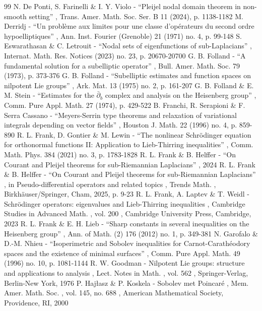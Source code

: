 \documentclass[11pt]{article}
\theoremstyle{definition}
\newcommand{\1}{\mathbbm{1}}
\numberwithin{equation}{section}
\begin{document}
\begin{thebibliography}{99}
 N. De Ponti, S. Farinelli \& I. Y. Violo - “Pleijel nodal domain theorem in non-smooth setting” , Trans. Amer. Math. Soc. Ser. B 11 (2024), p. 1138-1182
 M. Derridj - “Un problème aux limites pour une classe d’opérateurs du second ordre hypoelliptiques” , Ann. Inst. Fourier (Grenoble) 21 (1971) no. 4, p. 99-148
 S. Eswarathasan \& C. Letrouit - “Nodal sets of eigenfunctions of sub-Laplacians” , Internat. Math. Res. Notices (2023) no. 23, p. 20670-20700
 G. B. Folland - “A fundamental solution for a subelliptic operator” , Bull. Amer. Math. Soc. 79 (1973), p. 373-376
 G. B. Folland - “Subelliptic estimates and function spaces on nilpotent Lie groups” , Ark. Mat. 13 (1975) no. 2, p. 161-207
 G. B. Folland \& E. M. Stein - “Estimates for the $\bar{\partial }_{b}$ complex and analysis on the Heisenberg group” , Comm. Pure Appl. Math. 27 (1974), p. 429-522
 B. Franchi, R. Serapioni \& F. Serra Cassano - “Meyers-Serrin type theorems and relaxation of variational integrals depending on vector fields” , Houston J. Math. 22 (1996) no. 4, p. 859-890
 R. L. Frank, D. Gontier \& M. Lewin - “The nonlinear Schrödinger equation for orthonormal functions II: Application to Lieb-Thirring inequalities” , Comm. Math. Phys. 384 (2021) no. 3, p. 1783-1828
 R. L. Frank \& B. Helffer - “On Courant and Pleijel theorems for sub-Riemannian Laplacians” , 2024
 R. L. Frank \& B. Helffer - “On Courant and Pleijel theorems for sub-Riemannian Laplacians” , in Pseudo-differential operators and related topics , Trends Math. , Birkhäuser/Springer, Cham, 2025, p. 9-23
 R. L. Frank, A. Laptev \& T. Weidl - Schrödinger operators: eigenvalues and Lieb-Thirring inequalities , Cambridge Studies in Advanced Math. , vol. 200 , Cambridge University Press, Cambridge, 2023
 R. L. Frank \& E. H. Lieb - “Sharp constants in several inequalities on the Heisenberg group” , Ann. of Math. (2) 176 (2012) no. 1, p. 349-381
 N. Garofalo \& D.-M. Nhieu - “Isoperimetric and Sobolev inequalities for Carnot-Carathéodory spaces and the existence of minimal surfaces” , Comm. Pure Appl. Math. 49 (1996) no. 10, p. 1081-1144
 R. W. Goodman - Nilpotent Lie groups: structure and applications to analysis , Lect. Notes in Math. , vol. 562 , Springer-Verlag, Berlin-New York, 1976
 P. Hajłasz \& P. Koskela - Sobolev met Poincaré , Mem. Amer. Math. Soc. , vol. 145, no. 688 , American Mathematical Society, Providence, RI, 2000

\end{thebibliography}
\end{document}
